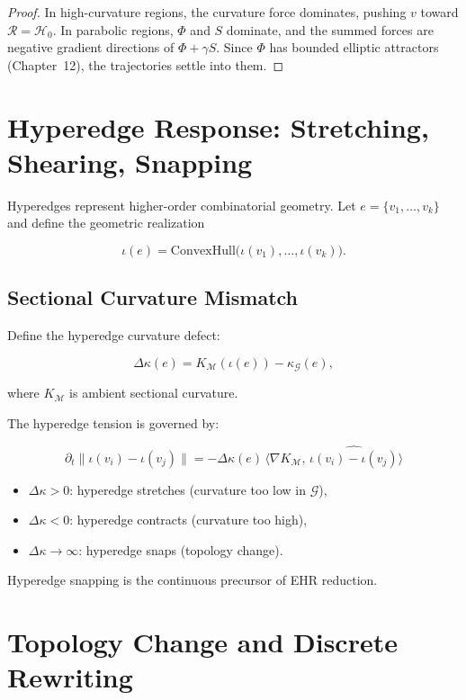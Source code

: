 \begin{proof}
In high-curvature regions, the curvature force dominates, pushing $v$ toward
$\mathcal{R}=\mathcal{H}_0$.  
In parabolic regions, $\Phi$ and $S$ dominate, and the summed forces are
negative gradient directions of $\Phi + \gamma S$.  
Since $\Phi$ has bounded elliptic attractors (Chapter~12),
the trajectories settle into them.
\end{proof}

\section{Hyperedge Response: Stretching, Shearing, Snapping}

Hyperedges represent higher-order combinatorial geometry.  
Let $e=\{v_1,\dots,v_k\}$ and define the geometric realization

\[
\iota(e) = \mathrm{ConvexHull}\bigl(\iota(v_1),\dots,\iota(v_k)\bigr).
\]

\subsection{Sectional Curvature Mismatch}

Define the hyperedge curvature defect:

\begin{equation}
\Delta\kappa(e)
  = K_{\mathcal{M}}(\iota(e))
    - \kappa_{\mathcal{G}}(e),
\end{equation}

where $K_{\mathcal{M}}$ is ambient sectional curvature.

The hyperedge tension is governed by:

\[
\partial_t\lVert \iota(v_i)-\iota(v_j)\rVert
  = -\Delta\kappa(e)\,
    \langle \nabla K_{\mathcal{M}},\, \widehat{\iota(v_i)-\iota(v_j)}\rangle
\]

\begin{itemize}
\item $\Delta\kappa>0$: hyperedge stretches (curvature too low in $\mathcal{G}$),
\item $\Delta\kappa<0$: hyperedge contracts (curvature too high),
\item $\Delta\kappa\to\infty$: hyperedge snaps (topology change).
\end{itemize}

Hyperedge snapping is the continuous precursor of EHR reduction.

\section{Topology Change and Discrete Rewriting}

